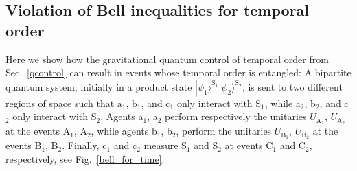 \documentclass[a4paper,11pt]{article}
\newcommand{\ket}{\rangle}
\begin{document}
%


\subsection*{Violation of Bell inequalities for temporal order}
\label{sec:violation}

Here we show how the gravitational quantum control of temporal order from Sec.\ \ref{qcontrol} can result in events whose temporal order is entangled: %
A bipartite quantum system, initially in a product state $|\psi_1\ket^\mathrm{S_1}|\psi_2\ket^\mathrm{S_2}$, is sent to two different regions of space such that $\mathrm{a_1}$, $\mathrm{b_1}$, and c$_1$ only interact with S$_1$, while a$_2$, b$_2$, and c$_2$ only interact with S$_2$. Agents a$_1$, a$_2$ perform respectively the unitaries $U_\mathrm{A_1}$, $U_\mathrm{A_2}$ at the events A$_1$, A$_2$, while agents b$_1$, b$_2$, perform the unitaries $U_\mathrm{B_1}$, $U_\mathrm{B_2}$ at the events B$_1$, B$_2$. Finally, $\mathrm{c_1}$ and $\mathrm{c_2}$ measure S$_1$ and S$_2$ at events C$_1$ and C$_2$, respectively, see Fig.\ \ref{bell_for_time}.
\end{document}
